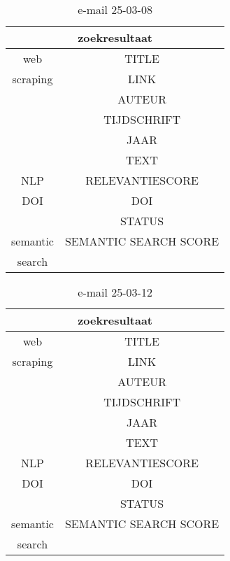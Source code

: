 \begin{table}[h!]
    \caption{e-mail 25-03-08}
    \centering
    \begin{tabular}{|c|c|} 
        \hline
        \multicolumn{2}{|c|}{\textbf{zoekresultaat}} \\
        \hline
        web &TITLE\\
        scraping&LINK\\
        &AUTEUR\\
        &TIJDSCHRIFT\\
        &JAAR\\
        &TEXT\\
        \hline
        NLP&RELEVANTIESCORE\\
        \hline
        DOI&DOI\\
        &STATUS\\
        \hline
        semantic&SEMANTIC SEARCH SCORE\\
        search&\\
        \hline
    \end{tabular}
    \label{table:email20250308}
\end{table}
\begin{table}[h!]
    \caption{e-mail 25-03-12}
    \centering
    \begin{tabular}{|c|c|} 
        \hline
        \multicolumn{2}{|c|}{\textbf{zoekresultaat}} \\
        \hline
        web &TITLE\\
        scraping&LINK\\
        &AUTEUR\\
        &TIJDSCHRIFT\\
        &JAAR\\
        &TEXT\\
        \hline
        NLP&RELEVANTIESCORE\\
        \hline
        DOI&DOI\\
        &STATUS\\
        \hline
        semantic&SEMANTIC SEARCH SCORE\\
        search&\\
        \hline
    \end{tabular}
    \label{table:email20250312}
\end{table}
